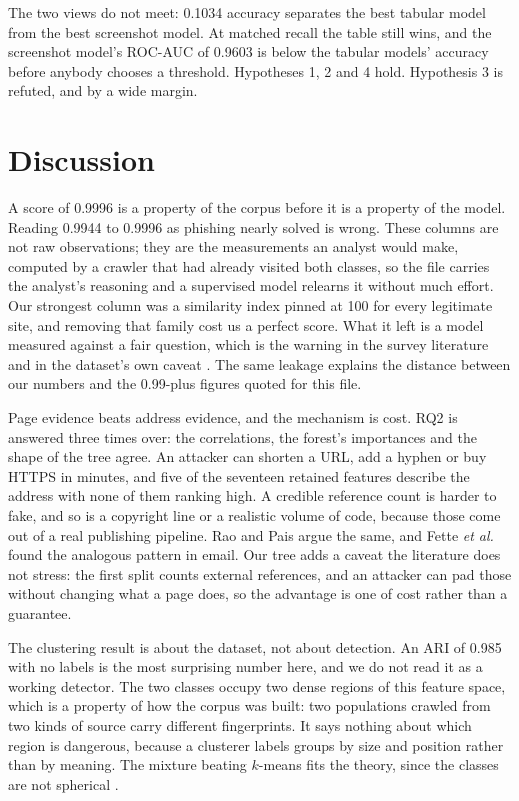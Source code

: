 \documentclass[11pt,journal,a4paper]{IEEEtran}
\begin{document}
The two views do not meet: 0.1034 accuracy separates the best tabular model from the best screenshot model. At matched
recall the table still wins, and the screenshot model's ROC-AUC of 0.9603 is below the tabular models' accuracy
before anybody chooses a threshold. Hypotheses 1, 2 and 4 hold. Hypothesis 3 is refuted, and by a wide margin.

\section{Discussion}
\label{sec:disc}

A score of 0.9996 is a property of the corpus before it is a property of the model. Reading 0.9944 to 0.9996 as
phishing nearly solved is wrong. These columns are not raw observations; they are the measurements an analyst
would make, computed by a crawler that had already visited both classes, so the file carries the analyst's
reasoning and a supervised model relearns it without much effort. Our strongest column was a similarity index
pinned at 100 for every legitimate site, and removing that family cost us a perfect score. What it left is a model
measured against a fair question, which is the warning in the survey literature
\cite{khonji2013phishing,basit2021comprehensive} and in the dataset's own caveat \cite{prasad2024phiusiil}. The same leakage explains the distance between
our numbers and the 0.99-plus figures quoted for this file.

Page evidence beats address evidence, and the mechanism is cost. RQ2 is answered three times over: the
correlations, the forest's importances and the shape of the tree agree. An attacker can shorten a URL, add a
hyphen or buy HTTPS in minutes, and five of the seventeen retained features describe the address with none of them
ranking high. A credible reference count is harder to fake, and so is a copyright line or a realistic volume of
code, because those come out of a real publishing pipeline. Rao and Pais \cite{rao2019detection} argue the same,
and Fette \emph{et al.} \cite{fette2007learning} found the analogous pattern in email. Our tree adds a caveat the
literature does not stress: the first split counts external references, and an attacker can pad those without
changing what a page does, so the advantage is one of cost rather than a guarantee.

The clustering result is about the dataset, not about detection. An ARI of 0.985 with no labels is the most
surprising number here, and we do not read it as a working detector. The two classes occupy two dense
regions of this feature space, which is a property of how the corpus was built: two populations crawled from two
kinds of source carry different fingerprints. It says nothing about which region is dangerous, because a clusterer
labels groups by size and position rather than by meaning. The mixture beating $k$-means fits the theory, since
the classes are not spherical \cite{dempster1977maximum}.
\end{document}
